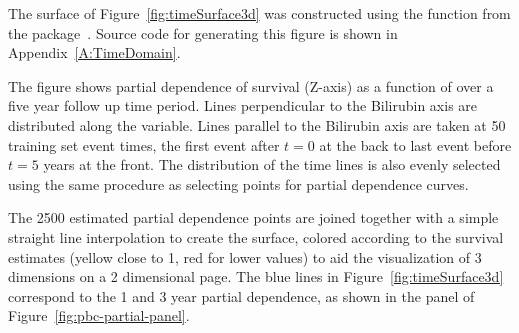 \documentclass[article]{jss}
\begin{document}
The  surface of Figure~\ref{fig:timeSurface3d} was constructed using the  function from the  package~\citep[\url{http://CRAN.R-project.org/package=plot3D}]{plot3D:2014}. Source code for generating this figure is shown in Appendix~\ref{A:TimeDomain}.

The figure shows partial dependence of survival (Z-axis) as a function of  over a five year follow up time period. Lines perpendicular to the Bilirubin axis are distributed along the  variable. Lines parallel to the Bilirubin axis are taken at 50 training set event times, the first event after $t=0$ at the back to last event before $t=5$ years at the front. The distribution of the time lines is also evenly selected using the same procedure as selecting points for partial dependence curves.

The 2500 estimated partial dependence points are joined together with a simple straight line interpolation to create the surface, colored according to the survival estimates (yellow close to 1, red for lower values) to aid the visualization of 3 dimensions on a 2 dimensional page. The blue lines in Figure~\ref{fig:timeSurface3d} correspond to the 1 and 3 year partial dependence, as shown in the  panel of Figure~\ref{fig:pbc-partial-panel}.
\end{document}
